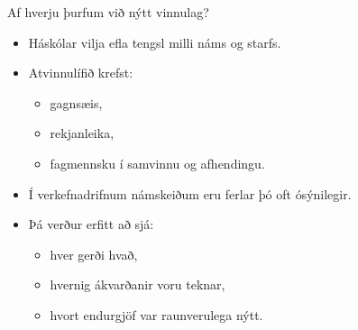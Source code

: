 \documentclass[
    NAME={Dr. Helga Ingimundardóttir},
    EMAIL={helgaingim@hi.is},
    FACULTY={Iðnaðarverkfræði},
    TITLE={Sýnileg samvinna með tólum atvinnulífsins},
    SUBTITLE={PR vinnulag og gagnsæir ferlar í verkefnadrifinni verkfræðikennslu},
    SEMINAR={Kennsluráðstefna KHA},
    DATE={28. mars 2026},
    WIDE=true,
    ICELANDIC=true
]{HI-LaTeX//hi-beamer}
\begin{document}
\begin{frame}{Af hverju þurfum við nýtt vinnulag?}
\begin{itemize}
  \item Háskólar vilja efla tengsl milli náms og starfs.
  \item Atvinnulífið krefst:
  \begin{itemize}
    \item gagnsæis,
    \item rekjanleika,
    \item fagmennsku í samvinnu og afhendingu.
  \end{itemize}
  \item Í verkefnadrifnum námskeiðum eru ferlar þó oft ósýnilegir.
  \item Þá verður erfitt að sjá:
  \begin{itemize}
    \item hver gerði hvað,
    \item hvernig ákvarðanir voru teknar,
    \item hvort endurgjöf var raunverulega nýtt.
  \end{itemize}
\end{itemize}


\end{frame}
\end{document}
